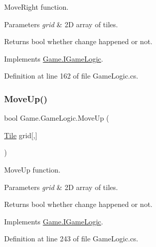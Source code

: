 Move\+Right function. 


\begin{DoxyParams}{Parameters}
{\em grid} & 2D array of tiles.\\
\hline
\end{DoxyParams}
\begin{DoxyReturn}{Returns}
bool whether change happened or not.
\end{DoxyReturn}


Implements \mbox{\hyperlink{interface_game_1_1_i_game_logic_a7ae3b1cdeb4f6eb82ee6298bdaa05b9e}{Game.\+I\+Game\+Logic}}.



Definition at line 162 of file Game\+Logic.\+cs.

\mbox{\label{class_game_1_1_game_logic_af397bfc00de61436b0ec1f5a837bc61c}} 
\subsubsection{\texorpdfstring{MoveUp()}{MoveUp()}}
{\footnotesize\ttfamily bool Game.\+Game\+Logic.\+Move\+Up (\begin{DoxyParamCaption}\item[{\mbox{\hyperlink{class_game_1_1_tile}{Tile}}}]{grid\mbox{[},\mbox{]} }\end{DoxyParamCaption})}



Move\+Up function. 


\begin{DoxyParams}{Parameters}
{\em grid} & 2D array of tiles.\\
\hline
\end{DoxyParams}
\begin{DoxyReturn}{Returns}
bool whether change happened or not.
\end{DoxyReturn}


Implements \mbox{\hyperlink{interface_game_1_1_i_game_logic_a13ef4621073f1ad055c2c62a92411f03}{Game.\+I\+Game\+Logic}}.



Definition at line 243 of file Game\+Logic.\+cs.

\mbox{\label{class_game_1_1_game_logic_a4e30bdba5b9817a7abb6e4509ab63e00}} 

